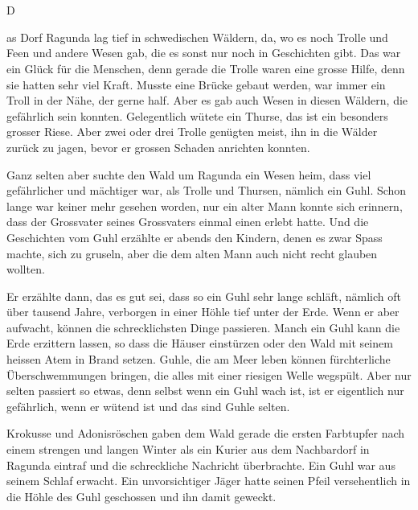 \chapter*{}
\lettrine[lines=3]{\color{red}D}{}\begin{swb}as Dorf Ragunda lag tief in schwedischen Wäldern, da, wo es noch Trolle und Feen und andere Wesen gab, die es sonst nur noch in Geschichten gibt. Das war ein Glück für die Menschen, denn gerade die Trolle waren eine grosse Hilfe, denn sie hatten sehr viel Kraft. Musste eine Brücke gebaut werden, war immer ein Troll in der Nähe, der gerne half. Aber es gab auch Wesen in diesen Wäldern, die gefährlich sein konnten. Gelegentlich wütete ein Thurse, das ist ein besonders grosser Riese. Aber zwei oder drei Trolle genügten meist, ihn in die Wälder zurück zu jagen, bevor er grossen Schaden anrichten konnten. 
    
Ganz selten aber suchte den Wald um Ragunda ein Wesen heim, dass viel gefährlicher und mächtiger war, als Trolle und Thursen, nämlich ein Guhl. Schon lange war keiner mehr gesehen worden, nur ein alter Mann konnte sich erinnern, dass der Grossvater seines Grossvaters einmal einen erlebt hatte. Und die Geschichten vom Guhl  erzählte er abends den Kindern, denen es zwar Spass machte, sich zu gruseln, aber die dem alten Mann auch nicht recht glauben wollten. 

Er erzählte dann, das es gut sei, dass so ein Guhl sehr lange schläft, nämlich oft über tausend Jahre, verborgen in einer Höhle tief unter der Erde. Wenn er aber aufwacht, können die schrecklichsten Dinge passieren. Manch ein Guhl kann die Erde erzittern lassen, so dass die Häuser einstürzen oder den Wald mit seinem heissen Atem in Brand setzen. Guhle, die am Meer leben können fürchterliche Überschwemmungen bringen, die alles mit einer riesigen Welle wegspült. Aber nur selten passiert so etwas, denn selbst wenn ein Guhl wach ist, ist er eigentlich nur gefährlich, wenn er wütend ist und das sind Guhle selten.

Krokusse und Adonisröschen gaben dem Wald gerade die ersten Farbtupfer nach einem strengen  und langen Winter als ein Kurier aus dem Nachbardorf in Ragunda eintraf und die schreckliche Nachricht überbrachte. Ein Guhl war aus seinem Schlaf erwacht. Ein unvorsichtiger Jäger hatte seinen Pfeil versehentlich in die Höhle des Guhl geschossen und ihn damit geweckt.



\end{swb}

